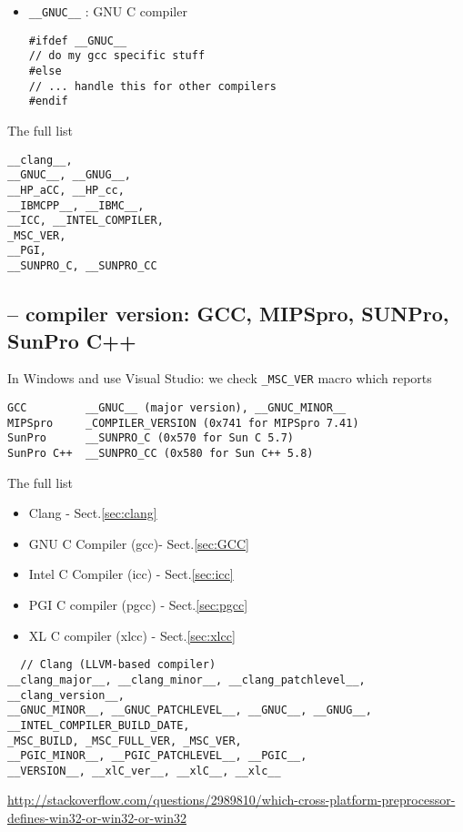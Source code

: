 \begin{itemize}
  \item \verb!__GNUC__! : GNU C compiler
  
\begin{lstlisting}
#ifdef __GNUC__
// do my gcc specific stuff
#else
// ... handle this for other compilers
#endif
\end{lstlisting}
\end{itemize}

The full list
\begin{lstlisting}
__clang__, 
__GNUC__, __GNUG__, 
__HP_aCC, __HP_cc, 
__IBMCPP__, __IBMC__, 
__ICC, __INTEL_COMPILER, 
_MSC_VER, 
__PGI, 
__SUNPRO_C, __SUNPRO_CC
\end{lstlisting}



\subsection{-- compiler version: GCC, MIPSpro, SUNPro, SunPro C++}
\label{sec:macro-detect-compiler-version}

In Windows and use Visual Studio: we check \verb!_MSC_VER! macro which reports

\begin{verbatim}
GCC         __GNUC__ (major version), __GNUC_MINOR__
MIPSpro     _COMPILER_VERSION (0x741 for MIPSpro 7.41)
SunPro      __SUNPRO_C (0x570 for Sun C 5.7)
SunPro C++  __SUNPRO_CC (0x580 for Sun C++ 5.8)
\end{verbatim}

The full list
\begin{itemize}
  \item Clang - Sect.\ref{sec:clang}
  
  \item GNU C Compiler (gcc)- Sect.\ref{sec:GCC}
  
  \item Intel C Compiler (icc) - Sect.\ref{sec:icc}
  
  \item PGI C compiler (pgcc) - Sect.\ref{sec:pgcc} 
  
  \item XL C compiler (xlcc) - Sect.\ref{sec:xlcc}
\end{itemize}

\begin{lstlisting}
  // Clang (LLVM-based compiler)
__clang_major__, __clang_minor__, __clang_patchlevel__, __clang_version__,
__GNUC_MINOR__, __GNUC_PATCHLEVEL__, __GNUC__, __GNUG__, 
__INTEL_COMPILER_BUILD_DATE, 
_MSC_BUILD, _MSC_FULL_VER, _MSC_VER, 
__PGIC_MINOR__, __PGIC_PATCHLEVEL__, __PGIC__, 
__VERSION__, __xlC_ver__, __xlC__, __xlc__
\end{lstlisting}

\url{http://stackoverflow.com/questions/2989810/which-cross-platform-preprocessor-defines-win32-or-win32-or-win32}

